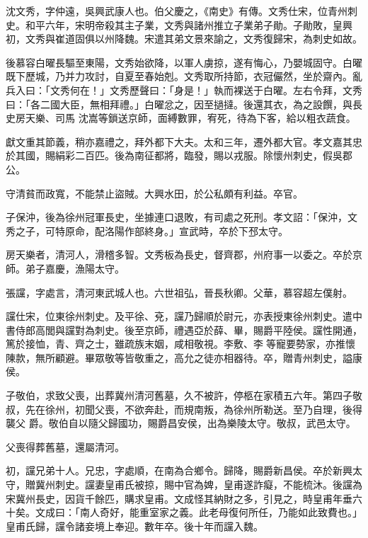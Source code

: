 \begin{pinyinscope}
 沈文秀，字仲遠，吳興武康人也。伯父慶之，《南史》有傳。文秀仕宋，位青州刺史。和平六年，宋明帝殺其主子業，文秀與諸州推立子業弟子勛。子勛敗，皇興初，文秀與崔道固俱以州降魏。宋遣其弟文景來諭之，文秀復歸宋，為刺史如故。



 後慕容白曜長驅至東陽，文秀始欲降，以軍人虜掠，遂有悔心，乃嬰城固守。白曜既下歷城，乃并力攻討，自夏至春始剋。文秀取所持節，衣冠儼然，坐於齋內。亂兵入曰：「文秀何在！」文秀歷聲曰：「身是！」執而裸送于白曜。左右令拜，文秀曰：「各二國大臣，無相拜禮。」白曜忿之，因至撾撻。後還其衣，為之設饌，與長史房天樂、司馬
 沈嵩等鎖送京師，面縛數罪，宥死，待為下客，給以粗衣蔬食。



 獻文重其節義，稍亦嘉禮之，拜外都下大夫。太和三年，遷外都大官。孝文嘉其忠於其國，賜絹彩二百匹。後為南征都將，臨發，賜以戎服。除懷州刺史，假吳郡公。



 守清貧而政寬，不能禁止盜賊。大興水田，於公私頗有利益。卒官。



 子保沖，後為徐州冠軍長史，坐據連口退敗，有司處之死刑。孝文詔：「保沖，文秀之子，可特原命，配洛陽作部終身。」宣武時，卒於下邳太守。



 房天樂者，清河人，滑稽多智。文秀板為長史，督齊郡，州府事一以委之。卒於京師。弟子嘉慶，漁陽太守。



 張讜，字處言，清河東武城人也。六世祖弘，晉長秋卿。父華，慕容超左僕射。



 讜仕宋，位東徐州刺史。及平徐、兗，讜乃歸順於尉元，亦表授東徐州刺史。遣中書侍郎高閭與讜對為刺史。後至京師，禮遇亞於薛、畢，賜爵平陸侯。讜性開通，篤於接恤，青、齊之士，雖疏族末姻，咸相敬視。李敷、李等寵要勢家，亦推懷陳款，無所顧避。畢眾敬等皆敬重之，高允之徒亦相器待。卒，贈青州刺史，謚康侯。



 子敬伯，求致父喪，出葬冀州清河舊墓，久不被許，停柩在家積五六年。第四子敬叔，先在徐州，初聞父喪，不欲奔赴，而規南叛，為徐州所勒送。至乃自理，後得襲父
 爵。敬伯自以隨父歸國功，賜爵昌安侯，出為樂陵太守。敬叔，武邑太守。



 父喪得葬舊墓，還屬清河。



 初，讜兄弟十人。兄忠，字處順，在南為合鄉令。歸降，賜爵新昌侯。卒於新興太守，贈冀州刺史。讜妻皇甫氏被掠，賜中官為婢，皇甫遂詐癡，不能梳沐。後讜為宋冀州長史，因貨千餘匹，購求皇甫。文成怪其納財之多，引見之，時皇甫年垂六十矣。文成曰：「南人奇好，能重室家之義。此老母復何所任，乃能如此致費也。」皇甫氏歸，讜令諸妾境上奉迎。數年卒。後十年而讜入魏。




\end{pinyinscope}
